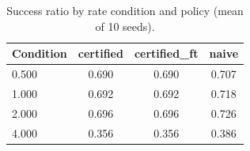\begin{table}[t]
\centering
\small
\caption{Success ratio by rate condition and policy (mean of 10 seeds).}
\label{tab:p3-rate}
\begin{tabular}{lccc}
\toprule
Condition & certified & certified\_ft & naive \\
\midrule
0.500 & 0.690 & 0.690 & 0.707 \\
1.000 & 0.692 & 0.692 & 0.718 \\
2.000 & 0.696 & 0.696 & 0.726 \\
4.000 & 0.356 & 0.356 & 0.386 \\
\bottomrule
\end{tabular}
\par\vspace{2pt}{\footnotesize\raggedright Rate factor multiplies all three application arrival rates.\par}
\end{table}
